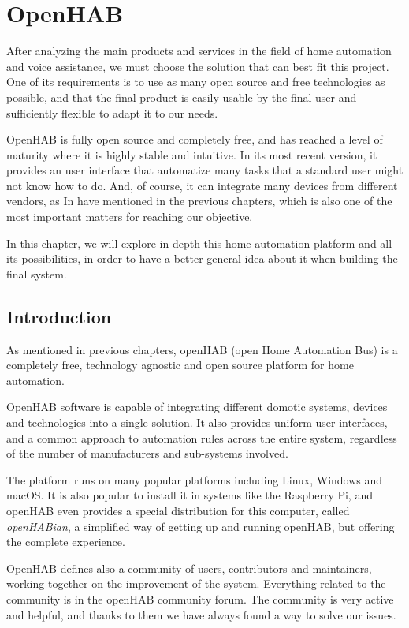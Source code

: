 \chapter{OpenHAB}

After analyzing the main products and services in the field of home automation and voice assistance, we must choose the solution
that can best fit this project. One of its requirements is to use as many open source and free technologies as possible, and that
the final product is easily usable by the final user and sufficiently flexible to adapt it to our needs.

OpenHAB is fully open source and completely free, and has reached a level of maturity where it is highly stable and intuitive. In its
most recent version, it provides an user interface that automatize many tasks that a standard user might not know how to do. And,
of course, it can integrate many devices from different vendors, as In have mentioned in the previous chapters, which is also one of
the most important matters for reaching our objective.

In this chapter, we will explore in depth this home automation platform and all its possibilities, in order to have a better general idea
about it when building the final system.

\section{Introduction}
As mentioned in previous chapters, openHAB (open Home Automation Bus) is a completely free, technology agnostic and open
source platform for home automation.

OpenHAB software is capable of integrating different domotic systems, devices and technologies into a single solution. It also
provides uniform user interfaces, and a common approach to automation rules across the entire system, regardless of the number
of manufacturers and sub-systems involved.\cite{openHABDocs}

The platform runs on many popular platforms including Linux, Windows and macOS. It is also popular to install it in systems like the
Raspberry Pi, and openHAB even provides a special distribution for this computer, called \textit{openHABian}, a simplified way of
getting up and running openHAB, but offering the complete experience.

OpenHAB defines also a community of users, contributors and maintainers, working together on the improvement of the system.
Everything related to the community is in the openHAB community forum. The community is very active and helpful, and thanks
to them we have always found a way to solve our issues.

